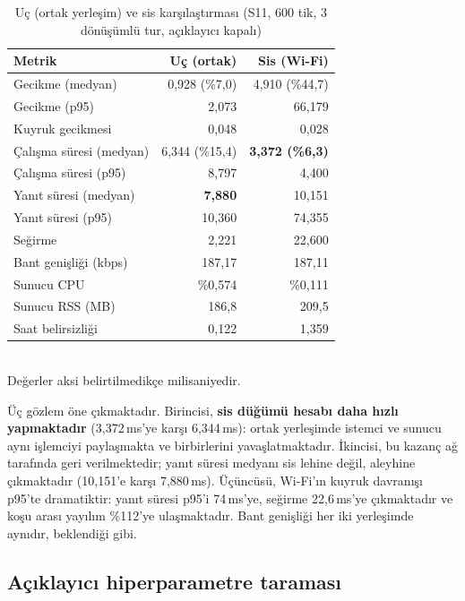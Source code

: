 \documentclass[conference]{IEEEtran}
\newcommand{\ms}{\,ms\xspace}
\begin{document}
\begin{table}[t]
\caption{Uç (ortak yerleşim) ve sis karşılaştırması (S11, 600 tik, 3 dönüşümlü
tur, açıklayıcı kapalı)}
\label{tab:yerlesim}
\centering
\small
\begin{tabular}{lrr}
\toprule
\textbf{Metrik} & \textbf{Uç (ortak)} & \textbf{Sis (Wi-Fi)}\\
\midrule
Gecikme (medyan)        & 0{,}928 (\%7{,}0)  & 4{,}910 (\%44{,}7)\\
Gecikme (p95)           & 2{,}073            & 66{,}179\\
Kuyruk gecikmesi        & 0{,}048            & 0{,}028\\
Çalışma süresi (medyan) & 6{,}344 (\%15{,}4) & \textbf{3{,}372 (\%6{,}3)}\\
Çalışma süresi (p95)    & 8{,}797            & 4{,}400\\
Yanıt süresi (medyan)   & \textbf{7{,}880}   & 10{,}151\\
Yanıt süresi (p95)      & 10{,}360           & 74{,}355\\
Seğirme                 & 2{,}221            & 22{,}600\\
Bant genişliği (kbps)   & 187{,}17           & 187{,}11\\
Sunucu CPU              & \%0{,}574          & \%0{,}111\\
Sunucu RSS (MB)         & 186{,}8            & 209{,}5\\
Saat belirsizliği       & 0{,}122            & 1{,}359\\
\bottomrule
\end{tabular}
\\[2pt]
\footnotesize Değerler aksi belirtilmedikçe milisaniyedir.
\end{table}

Üç gözlem öne çıkmaktadır. Birincisi, \textbf{sis düğümü hesabı daha hızlı
yapmaktadır} (3{,}372\ms'ye karşı 6{,}344\ms): ortak yerleşimde istemci ve
sunucu aynı işlemciyi paylaşmakta ve birbirlerini yavaşlatmaktadır. İkincisi,
bu kazanç ağ tarafında geri verilmektedir; yanıt süresi medyanı sis lehine
değil, aleyhine çıkmaktadır (10{,}151'e karşı 7{,}880\ms). Üçüncüsü, Wi-Fi'ın
kuyruk davranışı p95'te dramatiktir: yanıt süresi p95'i 74\ms'ye, seğirme
22{,}6\ms'ye çıkmaktadır ve koşu arası yayılım \%112'ye ulaşmaktadır. Bant
genişliği her iki yerleşimde aynıdır, beklendiği gibi.

\subsection{Açıklayıcı hiperparametre taraması}
\label{sec:xai-tarama}
\end{document}
